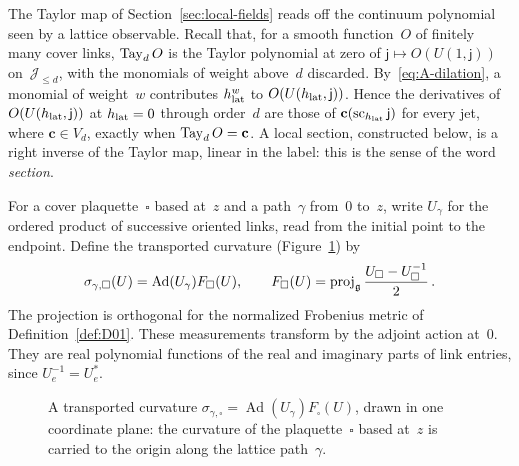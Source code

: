 The Taylor map of Section~\ref{sec:local-fields} reads off the continuum polynomial seen by a lattice observable. Recall that, for a smooth function~$O$ of finitely many cover links, $\operatorname{Tay}_{d}O$ is the Taylor polynomial at zero of $\mathsf j\mapsto O(U(1,\mathsf j))$ on~$\mathcal J_{\le d}$, with the monomials of weight above~$d$ discarded. By~\eqref{eq:A-dilation}, a monomial of weight~$w$ contributes $h_{\rm lat}^w$ to $O(U(h_{\rm lat},\mathsf j))$. Hence the derivatives of $O(U(h_{\rm lat},\mathsf j))$ at $h_{\rm lat}=0$ through order~$d$ are those of $\mathbf c(\operatorname{sc}_{h_{\rm lat}}\mathsf j)$ for every jet, where $\mathbf c\in V_d$, exactly when $\operatorname{Tay}_{d}O=\mathbf c$. A local section, constructed below, is a right inverse of the Taylor map, linear in the label: this is the sense of the word \emph{section}.

For a cover plaquette~$\square$ based at~$z$ and a path~$\gamma$ from~$0$ to~$z$, write $U_\gamma$ for the ordered product of successive oriented links, read from the initial point to the endpoint. Define the transported curvature (Figure~\ref{fig:A-transported}) by
\begin{equation*}
\sigma_{\gamma,\square}(U)=\operatorname{Ad}(U_\gamma)F_\square(U),\qquad
F_\square(U)=\operatorname{proj}_{\mathfrak{g}}\frac{U_\square-U_\square^{-1}}2\,.
\end{equation*}
The projection is orthogonal for the normalized Frobenius metric of Definition~\ref{def:D01}. These measurements transform by the adjoint action at~$0$. They are real polynomial functions of the real and imaginary parts of link entries, since $U_e^{-1}=U_e^*$.

\begin{figure}[ht]
\centering
{}
\caption{A transported curvature $\sigma_{\gamma,\square}=\operatorname{Ad}(U_\gamma)F_\square(U)$, drawn in one coordinate plane: the curvature of the plaquette~$\square$ based at~$z$ is carried to the origin along the lattice path~$\gamma$.}\label{fig:A-transported}
\end{figure}

